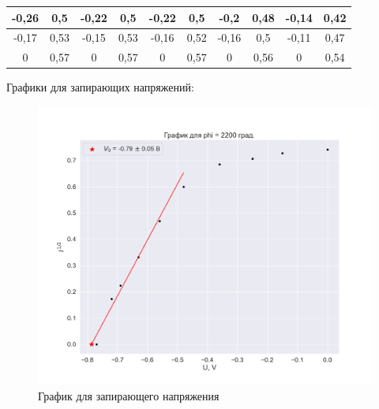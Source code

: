 \documentclass[a4paper, 12pt]{article}
\begin{document}
\begin{table}[H]
\begin{tabular}{|cc|cc|cc|cc|cc|}
	\multicolumn{1}{|c|}{-0,26}         & 0,5        & \multicolumn{1}{c|}{-0,22}         & 0,5        & \multicolumn{1}{c|}{-0,22}         & 0,5        & \multicolumn{1}{c|}{-0,2}          & 0,48       & \multicolumn{1}{c|}{-0,14}         & 0,42       \\ \hline
	\multicolumn{1}{|c|}{-0,17}         & 0,53       & \multicolumn{1}{c|}{-0,15}         & 0,53       & \multicolumn{1}{c|}{-0,16}         & 0,52       & \multicolumn{1}{c|}{-0,16}         & 0,5        & \multicolumn{1}{c|}{-0,11}         & 0,47       \\ \hline
	\multicolumn{1}{|c|}{0}             & 0,57       & \multicolumn{1}{c|}{0}             & 0,57       & \multicolumn{1}{c|}{0}             & 0,57       & \multicolumn{1}{c|}{0}             & 0,56       & \multicolumn{1}{c|}{0}             & 0,54       \\ \hline
	\end{tabular}
\end{table}

Графики для запирающих напряжений:

\begin{figure}[H]
    \centering
    \includegraphics[width=1\textwidth]{plot_zero1.png}
    \caption{График для запирающего напряжения}
\end{figure}
\end{document}
